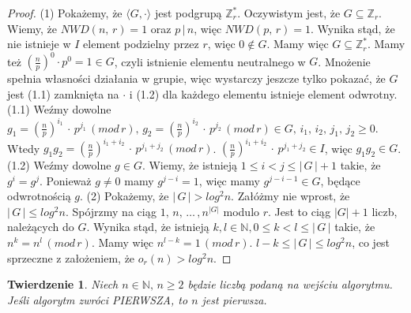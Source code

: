 \documentclass[declaration,shortabstract]{iithesis}
\theoremstyle{definition}
\theoremstyle{remark} \newtheorem{observation}{Obserwacja}
\theoremstyle{plain} \newtheorem{theorem}{Twierdzenie}
\theoremstyle{plain} \newtheorem{lemma}{Lemat}
\theoremstyle{remark} \newtheorem*{remark*}{Uwaga}
\theoremstyle{reminder} \newtheorem*{reminder*}{Przypomnienie}
\begin{document}
\begin{proof}
	(1) Pokażemy, że $\langle G, \cdot \rangle$ jest podgrupą $\mathbb{Z}_r^*$. Oczywistym jest, że $G \subseteq \mathbb{Z}_r$. Wiemy, że $NWD(n, \, r) = 1$ oraz $p \, | \, n$, więc $NWD(p, \, r) = 1$. Wynika stąd, że nie istnieje w $I$ element podzielny przez $r$, więc $0 \notin G$. Mamy więc $G \subseteq \mathbb{Z}_r^*$. Mamy też $(\frac{n}{p})^0\cdot p^0 = 1 \in G$, czyli istnienie elementu neutralnego w $G$. Mnożenie spełnia własności działania w grupie, więc wystarczy jeszcze tylko pokazać, że $G$ jest (1.1) zamknięta na $\cdot$ i (1.2) dla każdego elementu istnieje element odwrotny.\newline
	(1.1) Weźmy dowolne $g_1 = (\frac{n}{p})^{i_1} \, \cdot \, p^{j_1} \, (mod\,r), \, g_2 = (\frac{n}{p})^{i_2} \, \cdot \, p^{j_2}  \, (mod\,r) \in G, \, i_1, \,i_2, \,j_1, \, j_2 \geq 0$. Wtedy $g_1g_2 = (\frac{n}{p})^{i_1 + i_2} \, \cdot \, p^{j_1 + j_2} \, (mod\,r)$. $(\frac{n}{p})^{i_1 + i_2} \, \cdot \, p^{j_1 + j_2} \in I$, więc $g_1g_2\in G$. \newline
	(1.2) Weźmy dowolne $g \in G$. Wiemy, że istnieją $1 \leq i < j \leq | \, G \, | + 1$ takie, że $g^i = g^j$. Ponieważ $g \neq 0$ mamy $g^{j - i} = 1$, więc mamy $g^{j - i - 1} \in G$, będące odwrotnością $g$. \newline
	(2) Pokażemy, że $|\,G\,| > log^2n$. Załóżmy nie wprost, że $|\,G\,| \leq log^2n$. Spójrzmy na ciąg $1,\, n, \, \dots\,, n^{|G|}$ modulo $r$. Jest to ciąg $|G| + 1$ liczb, należących do $G$. Wynika stąd, że istnieją $k, l \in \mathbb{N}, 0 \leq k < l \leq |\,G\,|$ takie, że $n^k = n^l \, (mod\,r)$. Mamy więc $n^{l-k} = 1 \, (mod\,r)$. $l - k \leq |\,G\,| \leq log^2n$, co jest sprzeczne z założeniem, że $o_r(n) > log^2n$. 
\end{proof}
	
\begin{theorem}\label{T1}
	Niech $n \in \mathbb{N}, \, n \geq 2$ będzie liczbą podaną na wejściu algorytmu. Jeśli algorytm zwróci \textit{PIERWSZA}, to $n$ jest pierwsza.
\end{theorem}
	
\end{document}
